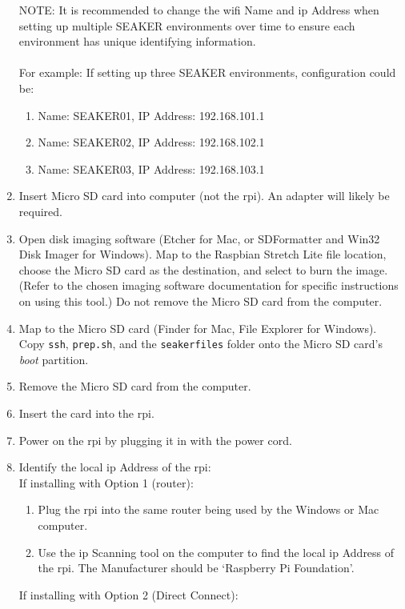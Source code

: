 \documentclass[12pt]{article}
\begin{document}
\begin{enumerate}
  NOTE: It is recommended to change the \gls{wifi} Name and \gls{ip} Address when
  setting up multiple SEAKER environments over time to ensure each
  environment has unique identifying information.\\
  \\
  For example: If setting up three SEAKER environments, configuration could be:
    \begin{enumerate}
      \item Name: SEAKER01, IP Address: 192.168.101.1
      \item Name: SEAKER02, IP Address: 192.168.102.1
      \item Name: SEAKER03, IP Address: 192.168.103.1
    \end{enumerate}
  \item Insert Micro SD card into computer (not the \gls{rpi}).
  An adapter will likely be required.
  \item Open disk imaging software (Etcher for Mac, or SDFormatter and 
  Win32 Disk Imager for Windows).
  Map to the Raspbian Stretch Lite file
  location, choose the Micro SD card as the destination, and select to burn
  the image. (Refer to the chosen imaging software documentation for
  specific instructions on using this tool.)  Do not remove the Micro SD
  card from the computer.
  \item Map to the Micro SD card (Finder for Mac, File Explorer for Windows).
  Copy \verb|ssh|, \verb|prep.sh|, and the \verb|seakerfiles| folder onto the Micro SD card's
  {\em boot} partition.
  \item Remove the Micro SD card from the computer.
  \item Insert the card into the \gls{rpi}.
  \item Power on the \gls{rpi} by plugging it in with the power cord.
  \item Identify the local \gls{ip} Address of the \gls{rpi}:\\
  If installing with Option 1 (router):
    \begin{enumerate}
      \item Plug the \gls{rpi} into the same router being used by the
      Windows or Mac computer.
      \item Use the \gls{ip} Scanning tool on the computer to find the local \gls{ip}
      Address of the \gls{rpi}. The Manufacturer should be ‘Raspberry
      Pi Foundation’.
    \end{enumerate}
  If installing with Option 2 (Direct Connect):
    \begin{enumerate}

\end{enumerate}
\end{enumerate}
\end{document}

